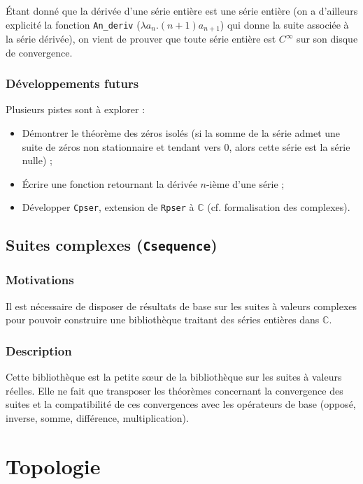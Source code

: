 \documentclass{article}
\newcommand{\coqcode}[1]{\texttt{#1}}
\begin{document}
Étant donné que la dérivée d'une série entière est une série entière (on a d'ailleurs explicité la fonction \coqcode{An\_deriv} ($\lambda a_n.(n+1)a_{n+1}$) qui donne la suite associée à la série dérivée), on vient de prouver que toute série entière est $C^{\infty}$ sur son disque de convergence.

\subsubsection{Développements futurs}

Plusieurs pistes sont à explorer :

\begin{itemize}
 \item Démontrer le théorème des zéros isolés (si la somme de la série admet une suite de zéros non stationnaire et tendant vers $0$, alors cette série est la série nulle) ;
 \item Écrire une fonction retournant la dérivée $n$-ième d'une série ;
 \item Développer \coqcode{Cpser}, extension de \coqcode{Rpser} à $\mathbb{C}$ (cf. formalisation des complexes).
\end{itemize}

\subsection{Suites complexes (\coqcode{Csequence})}

\subsubsection{Motivations}

Il est nécessaire de disposer de résultats de base sur les suites à valeurs complexes pour pouvoir construire une bibliothèque traitant des séries entières dans $\mathbb{C}$.

\subsubsection{Description}

Cette bibliothèque est la petite s\oe{}ur de la bibliothèque sur les suites à valeurs réelles. Elle ne fait que transposer les théorèmes concernant la convergence des suites et la compatibilité de ces convergences avec les opérateurs de base (opposé, inverse, somme, différence, multiplication).

\section{Topologie}
\end{document}
